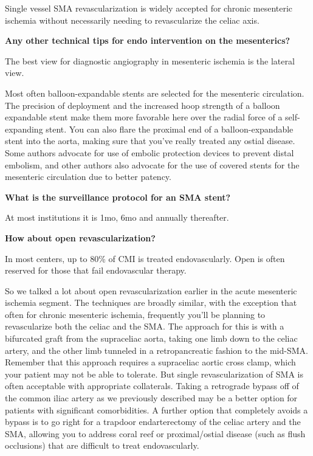 \documentclass[
]{book}
\begin{document}
Single vessel SMA revascularization is widely accepted for chronic
mesenteric ischemia without necessarily needing to revascularize the
celiac axis. \citep{oderich132ChronicMesenteric2019, foleyRevascularizationSuperiorMesenteric2000}

\textbf{Any other technical tips for endo intervention on the mesenterics?}

The best view for diagnostic angiography in mesenteric ischemia is the
lateral view.

Most often balloon-expandable stents are selected for the mesenteric
circulation. The precision of deployment and the increased hoop strength
of a balloon expandable stent make them more favorable here over the
radial force of a self-expanding stent. You can also flare the proximal
end of a balloon-expandable stent into the aorta, making sure that
you've really treated any ostial disease. Some authors advocate for use
of embolic protection devices to prevent distal embolism, and other
authors also advocate for the use of covered stents for the mesenteric
circulation due to better patency.\citep{oderichComparisonCoveredStents2013, oderich132ChronicMesenteric2019}

\textbf{What is the surveillance protocol for an SMA stent?}

At most institutions it is 1mo, 6mo and annually
thereafter.\citep{mohler2012, zierler2018}

\textbf{How about open revascularization?}

In most centers, up to 80\% of CMI is treated endovascularly. Open is
often reserved for those that fail endovascular
therapy.\citep{oderichOpenSurgicalTreatment2010, oderich132ChronicMesenteric2019}

So we talked a lot about open revascularization earlier in the acute
mesenteric ischemia segment. The techniques are broadly similar, with
the exception that often for chronic mesenteric ischemia, frequently
you'll be planning to revascularize both the celiac and the SMA. The
approach for this is with a bifurcated graft from the supraceliac aorta,
taking one limb down to the celiac artery, and the other limb tunneled
in a retropancreatic fashion to the mid-SMA. Remember that this approach
requires a supraceliac aortic cross clamp, which your patient may not be
able to tolerate. But single revascularization of SMA is often
acceptable with appropriate collaterals. Taking a retrograde bypass off
of the common iliac artery as we previously described may be a better
option for patients with significant comorbidities. A further option
that completely avoids a bypass is to go right for a trapdoor
endarterectomy of the celiac artery and the SMA, allowing you to address
coral reef or proximal/ostial disease (such as flush occlusions) that
are difficult to treat endovascularly.~
\end{document}
